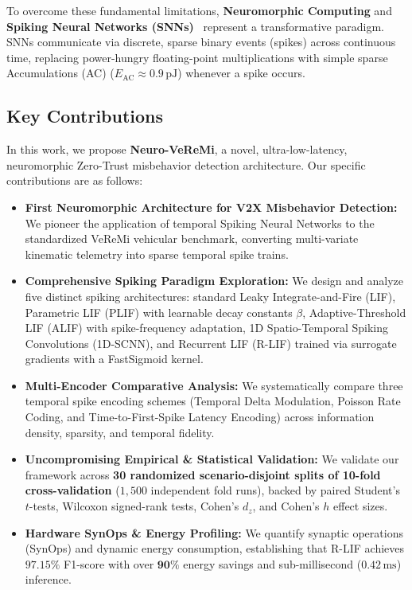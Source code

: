 \documentclass[journal,compsoc]{IEEEtran}
\begin{document}
To overcome these fundamental limitations, \textbf{Neuromorphic Computing} and \textbf{Spiking Neural Networks (SNNs)}~\cite{roy2019towards,davies2018loihi} represent a transformative paradigm. SNNs communicate via discrete, sparse binary events (spikes) across continuous time, replacing power-hungry floating-point multiplications with simple sparse Accumulations (AC) ($E_{\text{AC}} \approx 0.9\,\text{pJ}$) whenever a spike occurs.

\subsection{Key Contributions}
In this work, we propose \textbf{Neuro-VeReMi}, a novel, ultra-low-latency, neuromorphic Zero-Trust misbehavior detection architecture. Our specific contributions are as follows:
\begin{itemize}
    \item \textbf{First Neuromorphic Architecture for V2X Misbehavior Detection:} We pioneer the application of temporal Spiking Neural Networks to the standardized VeReMi vehicular benchmark, converting multi-variate kinematic telemetry into sparse temporal spike trains.
    \item \textbf{Comprehensive Spiking Paradigm Exploration:} We design and analyze five distinct spiking architectures: standard Leaky Integrate-and-Fire (LIF), Parametric LIF (PLIF) with learnable decay constants $\beta$, Adaptive-Threshold LIF (ALIF) with spike-frequency adaptation, 1D Spatio-Temporal Spiking Convolutions (1D-SCNN), and Recurrent LIF (R-LIF) trained via surrogate gradients with a FastSigmoid kernel.
    \item \textbf{Multi-Encoder Comparative Analysis:} We systematically compare three temporal spike encoding schemes (Temporal Delta Modulation, Poisson Rate Coding, and Time-to-First-Spike Latency Encoding) across information density, sparsity, and temporal fidelity.
    \item \textbf{Uncompromising Empirical & Statistical Validation:} We validate our framework across \textbf{30 randomized scenario-disjoint splits of 10-fold cross-validation} ($1,500$ independent fold runs), backed by paired Student's $t$-tests, Wilcoxon signed-rank tests, Cohen's $d_z$, and Cohen's $h$ effect sizes.
    \item \textbf{Hardware SynOps & Energy Profiling:} We quantify synaptic operations (SynOps) and dynamic energy consumption, establishing that R-LIF achieves $\mathbf{97.15\%}$ F1-score with over $\mathbf{90\%}$ energy savings and sub-millisecond ($0.42\,\text{ms}$) inference.
\end{itemize}
\end{document}
